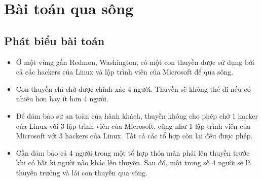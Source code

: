 \newpage
\section{Bài toán qua sông}
\subsection{Phát biểu bài toán}
\begin{itemize}
	\item Ở một vùng gần Redmon, Washington, có một con thuyền được sử dụng bởi cả các hackers của Linux và lập trình viên của Microsoft để qua sông.
	\item Con thuyền chỉ chở được chính xác 4 người. Thuyền sẽ không thể đi nếu có nhiều hơn hay ít hơn 4 người.
	\item Để đảm bảo sự an toàn của hành khách, thuyền không cho phép chở 1 hacker của Linux với 3 lập trình viên của Microsoft, cũng như 1 lập trình viên của Microsoft với 3 hackers của Linux. Tất cả các tổ hợp còn lại đều được phép.
	\item Cần đảm bảo cả 4 người trong một tổ hợp thỏa mãn phải lên thuyền trước khi có bất kì người nào khác lên thuyền. Sau đó, một trong số 4 người sẽ là thuyền trưởng và lái con thuyền qua sông. 
\end{itemize}

